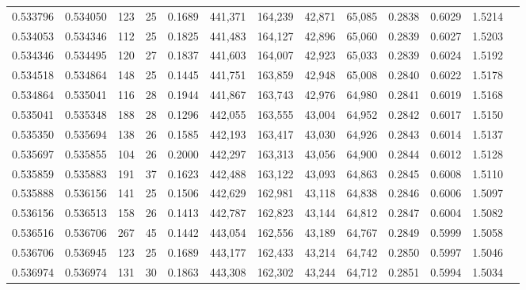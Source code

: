\begin{tabular}{rrrrrrrrrrrrr}
0.533796 & 0.534050 &   123 &  25 &                                     0.1689 & 441,371 & 164,239 &  42,871 &  65,085 & 0.2838 & 0.6029 & 1.5214 \\
0.534053 & 0.534346 &   112 &  25 &                                     0.1825 & 441,483 & 164,127 &  42,896 &  65,060 & 0.2839 & 0.6027 & 1.5203 \\
0.534346 & 0.534495 &   120 &  27 &                                     0.1837 & 441,603 & 164,007 &  42,923 &  65,033 & 0.2839 & 0.6024 & 1.5192 \\
0.534518 & 0.534864 &   148 &  25 &                                     0.1445 & 441,751 & 163,859 &  42,948 &  65,008 & 0.2840 & 0.6022 & 1.5178 \\
0.534864 & 0.535041 &   116 &  28 &                                     0.1944 & 441,867 & 163,743 &  42,976 &  64,980 & 0.2841 & 0.6019 & 1.5168 \\
0.535041 & 0.535348 &   188 &  28 &                                     0.1296 & 442,055 & 163,555 &  43,004 &  64,952 & 0.2842 & 0.6017 & 1.5150 \\
0.535350 & 0.535694 &   138 &  26 &                                     0.1585 & 442,193 & 163,417 &  43,030 &  64,926 & 0.2843 & 0.6014 & 1.5137 \\
0.535697 & 0.535855 &   104 &  26 &                                     0.2000 & 442,297 & 163,313 &  43,056 &  64,900 & 0.2844 & 0.6012 & 1.5128 \\
0.535859 & 0.535883 &   191 &  37 &                                     0.1623 & 442,488 & 163,122 &  43,093 &  64,863 & 0.2845 & 0.6008 & 1.5110 \\
0.535888 & 0.536156 &   141 &  25 &                                     0.1506 & 442,629 & 162,981 &  43,118 &  64,838 & 0.2846 & 0.6006 & 1.5097 \\
0.536156 & 0.536513 &   158 &  26 &                                     0.1413 & 442,787 & 162,823 &  43,144 &  64,812 & 0.2847 & 0.6004 & 1.5082 \\
0.536516 & 0.536706 &   267 &  45 &                                     0.1442 & 443,054 & 162,556 &  43,189 &  64,767 & 0.2849 & 0.5999 & 1.5058 \\
0.536706 & 0.536945 &   123 &  25 &                                     0.1689 & 443,177 & 162,433 &  43,214 &  64,742 & 0.2850 & 0.5997 & 1.5046 \\
0.536974 & 0.536974 &   131 &  30 &                                     0.1863 & 443,308 & 162,302 &  43,244 &  64,712 & 0.2851 & 0.5994 & 1.5034 \\

\end{tabular}

